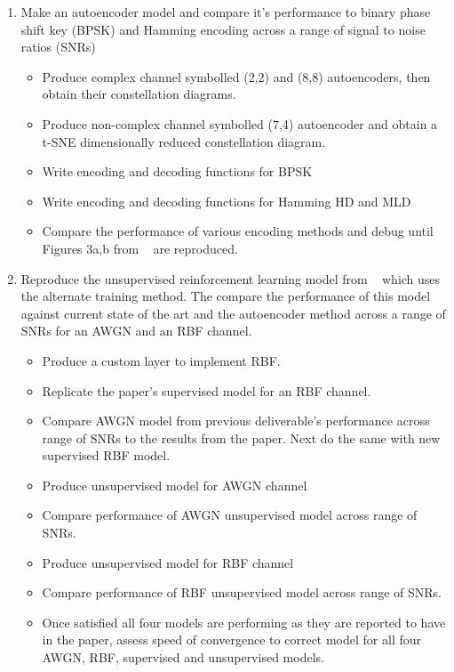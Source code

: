 \documentclass[12pt,onecolumn,letterpaper]{article}
\begin{document}
\begin{enumerate}
   \item Make an autoencoder model and compare it's performance to binary phase shift key (BPSK) and Hamming encoding across a range of signal to noise ratios (SNRs)
   \begin{itemize}
      \item Produce complex channel symbolled (2,2) and (8,8) autoencoders, then obtain their constellation diagrams.
      \item Produce non-complex channel symbolled (7,4) autoencoder and obtain a t-SNE dimensionally reduced constellation diagram.
      \item Write encoding and decoding functions for BPSK
      \item Write encoding and decoding functions for Hamming HD and MLD
      \item Compare the performance of various encoding methods and debug until Figures 3a,b from ~\cite{oShea} are reproduced.
   \end{itemize}
   \item Reproduce the unsupervised reinforcement learning model from ~\cite{Aoudia} which uses the alternate training method. The compare the performance of this model against current state of the art and the autoencoder method across a range of SNRs for an AWGN and an RBF channel.
   \begin{itemize}
      \item Produce a custom layer to implement RBF.
      \item Replicate the paper's supervised model for an RBF channel.
      \item Compare AWGN model from previous deliverable's performance across range of SNRs to the results from the paper. Next do the same with new supervised RBF model.
      \item Produce unsupervised model for AWGN channel
      \item Compare performance of AWGN unsupervised model across range of SNRs.
      \item Produce unsupervised model for RBF channel
      \item Compare performance of RBF unsupervised model across range of SNRs.
      \item Once satisfied all four models are performing as they are reported to have in the paper, assess speed of convergence to correct model for all four AWGN, RBF, supervised and unsupervised models.
   \end{itemize}
\end{enumerate}
\end{document}

